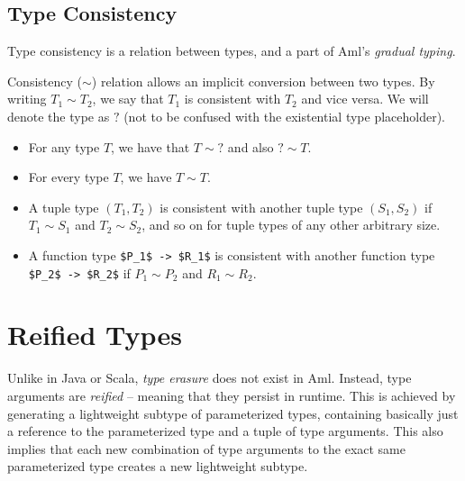 \subsection{Type Consistency}
\label{sec:type-consistency}

Type consistency is a relation between types, and a part of Aml's {\em gradual typing}. 

Consistency ($\sim$) relation allows an implicit conversion between two types. By writing $T_1 \sim T_2$, we say that $T_1$ is consistent with $T_2$ and vice versa. We will denote the  type as $?$ (not to be confused with the existential type placeholder). 

\begin{itemize}
  \item For any type $T$, we have that $T \sim ?$ and also $? \sim T$. 
  \item For every type $T$, we have $T \sim T$. 
  \item A tuple type $(T_1, T_2)$ is consistent with another tuple type $(S_1, S_2)$ if $T_1 \sim S_1$ and $T_2 \sim S_2$, and so on for tuple types of any other arbitrary size. 
  \item A function type \lstinline!$P_1$ -> $R_1$! is consistent with another function type \lstinline!$P_2$ -> $R_2$! if $P_1 \sim P_2$ and $R_1 \sim R_2$. 
\end{itemize}





\section{Reified Types}
\label{sec:reified-types}

Unlike in Java or Scala, {\em type erasure} does not exist in Aml. Instead, type arguments are {\em reified} -- meaning that they persist in runtime. This is achieved by generating a lightweight subtype of parameterized types, containing basically just a reference to the parameterized type and a tuple of type arguments. This also implies that each new combination of type arguments to the exact same parameterized type creates a new lightweight subtype.

